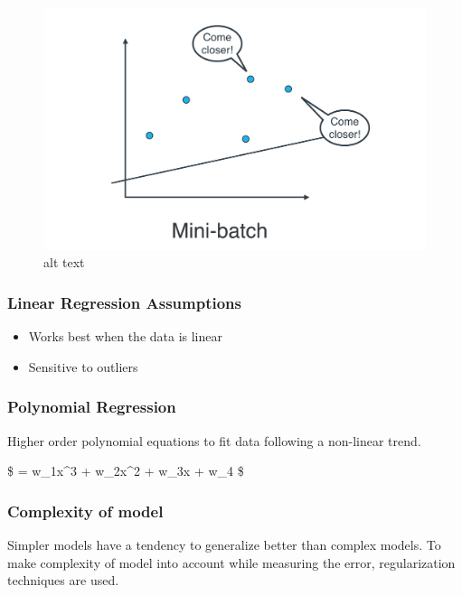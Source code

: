 \documentclass[11pt]{article}
\makeatletter
\def\maxwidth{\ifdim\Gin@nat@width>\linewidth\linewidth
    \else\Gin@nat@width\fi}
\let\Oldincludegraphics\includegraphics
\renewcommand{\includegraphics}[1]{\Oldincludegraphics[width=.8\maxwidth]{#1}}
\providecommand{\tightlist}{%
      \setlength{\itemsep}{0pt}\setlength{\parskip}{0pt}}
\makeatother
\begin{document}
\begin{figure}
\centering
\includegraphics{minibatch.png}
\caption{alt text}
\end{figure}

    \hypertarget{linear-regression-assumptions}{%
\subsubsection{Linear Regression
Assumptions}\label{linear-regression-assumptions}}

\begin{itemize}
\tightlist
\item
  Works best when the data is linear
\item
  Sensitive to outliers
\end{itemize}

    \hypertarget{polynomial-regression}{%
\subsubsection{Polynomial Regression}\label{polynomial-regression}}

Higher order polynomial equations to fit data following a non-linear
trend.

\$  = w\_1x\^{}3 + w\_2x\^{}2 + w\_3x + w\_4 \$

    \hypertarget{complexity-of-model}{%
\subsubsection{Complexity of model}\label{complexity-of-model}}

Simpler models have a tendency to generalize better than complex models.
To make complexity of model into account while measuring the error,
regularization techniques are used.
\end{document}
